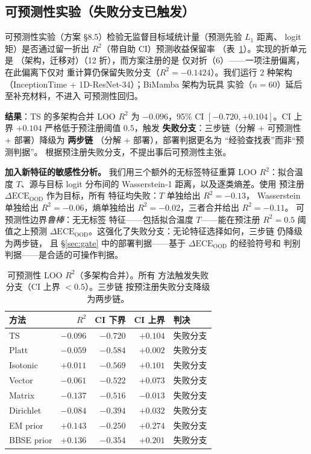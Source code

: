 \subsection{可预测性实验（失败分支已触发）}
\label{sec:predictability}
可预测性实验（方案 \S8.5）检验无监督目标域统计量（预测先验 $L_1$ 距离、
logit 矩）是否通过留一折出 $R^2$（带自助 CI）预测收益保留率
（表~\ref{tab:predictability}）。实现的折单元是
（架构，迁移对）（12 折），而方案注册的是
仅对折（6）——一项注册偏离，在此偏离下仅对
重计算仍保留失败分支（$R^2=-0.1424$）。我们运行 2 种架构
（InceptionTime + 1D-ResNet-34）；BiMamba 架构为玩具
实验（$n=60$）延后至补充材料，不进入
可预测性回归。

\textbf{结果}：TS 的多架构合并 LOO $R^2$ 为
$-0.096$，95\% CI $[-0.720, +0.104]$。CI 上界 $+0.104$
严格低于预注册阈值 $0.5$，触发
\textbf{失败分支}：三步链（分解 +
可预测性 + 部署）降级为 \textbf{两步链}
（分解 + 部署），部署判据更名为
``经验查找表''而非``预测判据''。
根据预注册失败分支，不提出事后可预测性主张。

\textbf{加入新特征的敏感性分析。} 我们用三个额外的无标签特征重算 LOO
$R^2$：拟合温度
$T$、源与目标 logit
分布间的 Wasserstein-1 距离，以及逐类熵差。使用
预注册 $\Delta\text{ECE}_{\text{OOD}}$ 作为目标，所有
特征均失败：$T$ 单独给出 $R^2=-0.13$，
Wasserstein 单独给出 $R^2=-0.06$，熵单独给出
$R^2=-0.02$，三者合并给出 $R^2=-0.11$。
可预测性边界\emph{鲁棒}：无无标签
特征——包括拟合温度 $T$——能在预注册 $R^2=0.5$
阈值之上预测 $\Delta\text{ECE}_{\text{OOD}}$。这强化了失败分支：无论特征选择如何，三步链
仍降级为两步链，
且 \S\ref{sec:gate} 中的部署判据——基于
$\Delta\text{ECE}_{\text{OOD}}$ 的经验符号和
判别判据——是合适的可操作判据。

\begin{table}[t]
\centering
\caption{可预测性 LOO $R^2$（多架构合并）。所有
方法触发失败分支（CI 上界 $<0.5$）。三步链
按预注册失败分支降级为两步链。}
\label{tab:predictability}
\begin{tabular}{lrrrl}
\toprule
方法 & $R^2$ & CI 下界 & CI 上界 & 判决 \\
\midrule
TS         & $-0.096$ & $-0.720$ & $+0.104$ & 失败分支 \\
Platt      & $-0.059$ & $-0.584$ & $+0.002$ & 失败分支 \\
Isotonic   & $+0.011$ & $-0.569$ & $+0.101$ & 失败分支 \\
Vector     & $-0.061$ & $-0.522$ & $+0.073$ & 失败分支 \\
Matrix     & $-0.137$ & $-0.516$ & $-0.013$ & 失败分支 \\
Dirichlet  & $-0.084$ & $-0.394$ & $+0.032$ & 失败分支 \\
EM prior   & $+0.143$ & $-0.250$ & $+0.274$ & 失败分支 \\
BBSE prior & $+0.136$ & $-0.354$ & $+0.201$ & 失败分支 \\
\bottomrule
\end{tabular}
\end{table}

